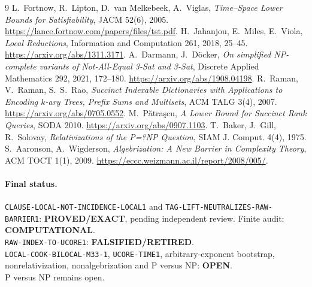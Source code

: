 \documentclass[11pt]{article}
\newcommand{\EXACT}{\textbf{PROVED/EXACT}}
\newcommand{\OPEN}{\textbf{OPEN}}
\newcommand{\RETIRED}{\textbf{FALSIFIED/RETIRED}}
\newcommand{\COMP}{\textbf{COMPUTATIONAL}}
\begin{document}
\begin{thebibliography}{9}
L.~Fortnow, R.~Lipton, D.~van Melkebeek, A.~Viglas,
\emph{Time--Space Lower Bounds for Satisfiability}, JACM 52(6), 2005.
\url{https://lance.fortnow.com/papers/files/tst.pdf}.
H.~Jahanjou, E.~Miles, E.~Viola,
\emph{Local Reductions}, Information and Computation 261, 2018, 25--45.
\url{https://arxiv.org/abs/1311.3171}.
A.~Darmann, J.~D\"ocker,
\emph{On simplified NP-complete variants of Not-All-Equal 3-Sat and 3-Sat},
Discrete Applied Mathematics 292, 2021, 172--180.
\url{https://arxiv.org/abs/1908.04198}.
R.~Raman, V.~Raman, S.~S.~Rao,
\emph{Succinct Indexable Dictionaries with Applications to Encoding
$k$-ary Trees, Prefix Sums and Multisets}, ACM TALG 3(4), 2007.
\url{https://arxiv.org/abs/0705.0552}.
M.~P\u{a}tra\c{s}cu, \emph{A Lower Bound for Succinct Rank Queries},
SODA 2010. \url{https://arxiv.org/abs/0907.1103}.
T.~Baker, J.~Gill, R.~Solovay,
\emph{Relativizations of the P=?NP Question}, SIAM J. Comput. 4(4), 1975.
S.~Aaronson, A.~Wigderson,
\emph{Algebrization: A New Barrier in Complexity Theory}, ACM TOCT 1(1),
2009. \url{https://eccc.weizmann.ac.il/report/2008/005/}.
\end{thebibliography}

\paragraph{Final status.}
\texttt{CLAUSE-LOCAL-NOT-INCIDENCE-LOCAL1} and
\texttt{TAG-LIFT-NEUTRALIZES-RAW-BARRIER1}: \EXACT, pending independent
review.  Finite audit: \COMP.\\
\texttt{RAW-INDEX-TO-UCORE1}: \RETIRED.\\
\texttt{LOCAL-COOK-BILOCAL-M33-1}, \texttt{UCORE-TIME1}, arbitrary-exponent
bootstrap, nonrelativization, nonalgebrization and P versus NP: \OPEN.\\
P versus NP remains open.

\end{document}
